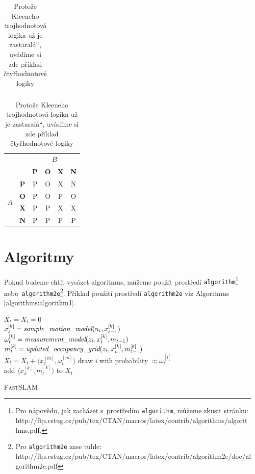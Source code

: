 \documentclass[a4paper, 11pt]{article}
\newcommand{\uvcs}[1]{\quotedblbase #1\textquotedblleft}
\begin{document}
\begin{table}[h]
\begin{tabular}{|c|c|c|c|c|c|}
\end{tabular}
\begin{tabular}{|c|c|c|c|c|c|}
\hline
\multicolumn{2}{|l|}{         \multirow{2}{*}{$A \rightarrow B$}} & \multicolumn{4}{c|}{$B$}    \\ \cline{3-6} 
\multicolumn{2}{|l|}{}      & \textbf{P}    & \textbf{O}   & \textbf{X}   & \textbf{N}   \\ \hline
\multirow{4}{*}{$A$}        & \textbf{P}    & P            & O            & X      & N   \\ \cline{2-6} 
                            & \textbf{O}    & P            & O            & P      & O   \\ \cline{2-6} 
                            & \textbf{X}    & P            & P            & X      & X   \\ \cline{2-6} 
                            & \textbf{N}    & P            & P            & P      & P   \\ \hline
\end{tabular}
\caption{Protože Kleeneho trojhodnotová logika už je \uvcs{zastaralá}, uvádíme si zde příklad čtyřhodnotové logiky}
\label{tables:table2}
\end{table}

\section{Algoritmy} \label{section:Algorithms}
Pokud budeme chtít vysázet algoritmus, můžeme použít prostředí {\texttt{algorithm}\footnote{Pro nápovědu, jak zacházet s~prostředím \texttt{algorithm}, můžeme zkusit stránku: \\ http://ftp.cstug.cz/pub/tex/CTAN/macros/latex/contrib/algorithms/algorithms.pdf.} }
nebo\,
\texttt{algorithm2e}\footnote{Pro \texttt{algorithm2e} zase tuhle: http://ftp.cstug.cz/pub/tex/CTAN/macros/latex/contrib/algorithm2e/doc/algorithm2e.pdf}.
Příklad použití prostředí \texttt{algorithm2e} viz Algoritmus \ref{algorithms:algorithm1}.
\bigskip

\IncMargin{1.5 em}
\begin{algorithm} 
\SetNlSty{}{}{:}

\Indm
{}
\BlankLine

\Indp
$\overline{X_t} = X_t = 0 $ \\
 {
    \Indpp
    $x^{[k]}_t = \emph{sample\_motion\_model} (u_t,x^{[k]}_{t-1})$ \\
    $\omega^{[k]}_t = \emph{measurement\_model} (z_t,x^{[k]}_t,m_{t-1})$ \\
    $m^{[k]}_t = \emph{updated\_occupancy\_grid} (z_t,x^{[k]}_t,m^{[k]}_{t-1})$ \\
    $\overline{X_t} = \overline{X_t} + \langle x^{[m]}_x,\omega^{[m]}_t \rangle $
}
 {
    \Indpp
    draw \emph{i} with probability $\approx \omega^{[i]}_t$ \\
    add $\langle x^{[k]}_x,m^{[k]}_t\rangle$ to $X_t$
}
\caption{\textsc{FastSLAM}}
\label{algorithms:algorithm1}
\end{algorithm}
\DecMargin{1.5 em}
\end{document}
